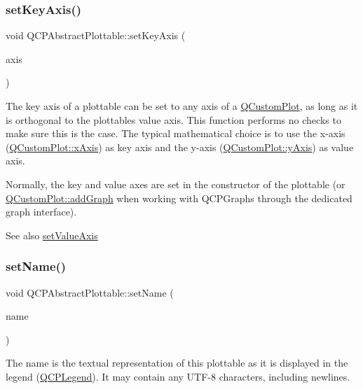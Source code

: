 \subsubsection{\texorpdfstring{set\+Key\+Axis()}{setKeyAxis()}}
{\footnotesize\ttfamily void Q\+C\+P\+Abstract\+Plottable\+::set\+Key\+Axis (\begin{DoxyParamCaption}\item[{\hyperlink{class_q_c_p_axis}{Q\+C\+P\+Axis} $\ast$}]{axis }\end{DoxyParamCaption})}

The key axis of a plottable can be set to any axis of a \hyperlink{class_q_custom_plot}{Q\+Custom\+Plot}, as long as it is orthogonal to the plottable\textquotesingle{}s value axis. This function performs no checks to make sure this is the case. The typical mathematical choice is to use the x-\/axis (\hyperlink{class_q_custom_plot_a9a79cd0158a4c7f30cbc702f0fd800e4}{Q\+Custom\+Plot\+::x\+Axis}) as key axis and the y-\/axis (\hyperlink{class_q_custom_plot_af6fea5679725b152c14facd920b19367}{Q\+Custom\+Plot\+::y\+Axis}) as value axis.

Normally, the key and value axes are set in the constructor of the plottable (or \hyperlink{class_q_custom_plot_a6fb2873d35a8a8089842d81a70a54167}{Q\+Custom\+Plot\+::add\+Graph} when working with Q\+C\+P\+Graphs through the dedicated graph interface).

\begin{DoxySeeAlso}{See also}
\hyperlink{class_q_c_p_abstract_plottable_a71626a07367e241ec62ad2c34baf21cb}{set\+Value\+Axis} 
\end{DoxySeeAlso}
\mbox{\label{class_q_c_p_abstract_plottable_ab79c7ba76bc7fa89a4b3580e12149f1f}} 
\subsubsection{\texorpdfstring{set\+Name()}{setName()}}
{\footnotesize\ttfamily void Q\+C\+P\+Abstract\+Plottable\+::set\+Name (\begin{DoxyParamCaption}\item[{const Q\+String \&}]{name }\end{DoxyParamCaption})}

The name is the textual representation of this plottable as it is displayed in the legend (\hyperlink{class_q_c_p_legend}{Q\+C\+P\+Legend}). It may contain any U\+T\+F-\/8 characters, including newlines. \mbox{\label{class_q_c_p_abstract_plottable_ab74b09ae4c0e7e13142fe4b5bf46cac7}} 
